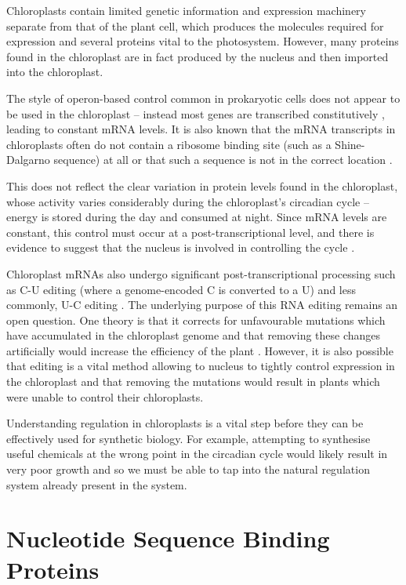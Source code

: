 Chloroplasts contain limited genetic information and expression machinery 
separate from that of the plant cell, which produces the molecules required 
for expression and several proteins vital to the photosystem.
However, many proteins found in the chloroplast are in fact produced by the
nucleus and then imported into the chloroplast.

The style of operon-based control common in prokaryotic cells does not appear 
to be used in the chloroplast -- instead most genes are 
transcribed constitutively \citep{Sugita1996}, leading to constant mRNA levels.
It is also known that the mRNA transcripts in chloroplasts often do not 
contain a ribosome binding site (such as a Shine-Dalgarno sequence) at all or 
that such a sequence is not in the correct 
location \citep{Sugiura1998,Zerges2000}.

This does not reflect the clear variation in protein levels found in the 
chloroplast, whose activity varies considerably during the chloroplast's 
circadian cycle -- energy is stored during the day and consumed at night.
Since mRNA levels are constant, this control must occur at a 
post-transcriptional level, and there is evidence to suggest that the nucleus
is involved in controlling the cycle \citep{Matsuo2006}.

Chloroplast mRNAs also undergo significant post-transcriptional processing such
as C-U editing (where a genome-encoded C is converted to a U) and less 
commonly, U-C editing \citep{Castandet2011}.
The underlying purpose of this RNA editing remains an open question. 
One theory is that it corrects for unfavourable mutations which have
accumulated in the chloroplast genome and that removing these changes 
artificially would increase the efficiency of the plant \citep{Fujii2011}.
However, it is also possible that editing is a vital method allowing to nucleus
to tightly control expression in the chloroplast and that removing the 
mutations would result in plants which were unable to control their 
chloroplasts.

Understanding regulation in chloroplasts is a vital step before they can be
effectively used for synthetic biology.
For example, attempting to synthesise useful chemicals at the wrong point in 
the circadian cycle would likely result in very poor growth and so we must be
able to tap into the natural regulation system already present in the system.

\section{Nucleotide Sequence Binding Proteins}
\label{sec:intro_binding}

